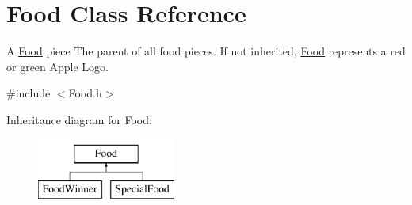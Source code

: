 \hypertarget{classFood}{\section{\-Food \-Class \-Reference}
\label{classFood}
}


\-A \hyperlink{classFood}{\-Food} piece \-The parent of all food pieces. \-If not inherited, \hyperlink{classFood}{\-Food} represents a red or green \-Apple \-Logo.  




{\ttfamily \#include $<$\-Food.\-h$>$}

\-Inheritance diagram for \-Food\-:\begin{figure}[H]
\begin{center}
\leavevmode
\includegraphics[height=2.000000cm]{classFood}
\end{center}
\end{figure}
